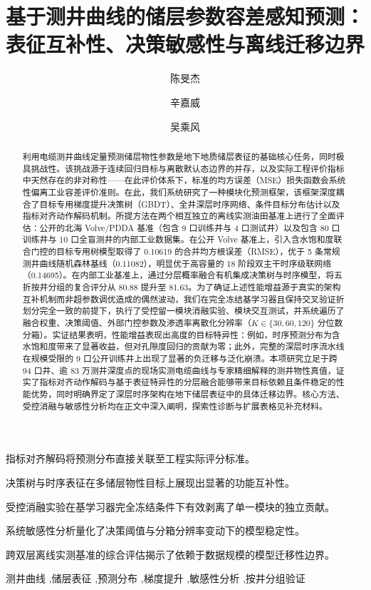\documentclass[preprint,12pt,nopreprintline]{elsarticle}
\begin{document}
\begin{frontmatter}
\title{基于测井曲线的储层参数容差感知预测：\\表征互补性、决策敏感性与离线迁移边界}
\author[aff1]{陈旻杰}
\author[aff2]{辛嘉威}
\author[aff1]{吴乘风}


\begin{abstract}
利用电缆测井曲线定量预测储层物性参数是地下地质储层表征的基础核心任务，同时极具挑战性。该挑战源于连续回归目标与离散默认态边界的并存，以及实际工程评价指标中天然存在的非对称性——在此评价体系下，标准的均方误差（MSE）损失函数会系统性偏离工业容差评价准则。在此，我们系统研究了一种模块化预测框架，该框架深度耦合了目标专用梯度提升决策树（GBDT）、全井深层时序网络、条件目标分布估计以及指标对齐动作解码机制。所提方法在两个相互独立的离线实测油田基准上进行了全面评估：公开的北海 Volve/PDDA 基准（包含 9 口训练井与 4 口测试井）以及包含 80 口训练井与 10 口全盲测井的内部工业数据集。在公开 Volve 基准上，引入含水饱和度联合门控的目标专用树模型取得了 0.10619 的合并均方根误差（RMSE），优于 5 条常规测井曲线随机森林基线（0.11082），明显优于高容量的 18 阶段双主干时序级联网络（0.14695）。在内部工业基准上，通过分层概率融合有机集成决策树与时序模型，将五折按井分组的复合评分从 80.88 提升至 81.63。为了确证上述性能增益源于真实的架构互补机制而非超参数调优造成的偶然波动，我们在完全冻结基学习器且保持交叉验证折划分完全一致的前提下，执行了受控留一模块消融实验、模块交互测试，并系统遍历了融合权重、决策阈值、外部门控参数及渗透率离散化分辨率（$K \in \{30, 60, 120\}$ 分位数分箱）。实证结果表明，性能增益表现出高度的目标特异性：例如，时序预测分布为含水饱和度带来了显著收益，但对孔隙度回归的贡献为零；此外，完整的深层时序流水线在规模受限的 9 口公开训练井上出现了显著的负迁移与泛化崩溃。本项研究立足于跨 94 口井、逾 83 万测井深度点的现场实测电缆曲线与专家精细解释的测井物性真值，证实了指标对齐动作解码与基于表征特异性的分层融合能够带来目标依赖且条件稳定的性能优势，同时明确界定了深层时序架构在地下储层表征中的具体迁移边界。核心方法、受控消融与敏感性分析均在正文中深入阐明，探索性诊断与扩展表格见补充材料。
\end{abstract}
\begin{highlights}
\item 指标对齐解码将预测分布直接关联至工程实际评分标准。
\item 决策树与时序表征在多储层物性目标上展现出显著的功能互补性。
\item 受控消融实验在基学习器完全冻结条件下有效剥离了单一模块的独立贡献。
\item 系统敏感性分析量化了决策阈值与分箱分辨率变动下的模型稳定性。
\item 跨双层离线实测基准的综合评估揭示了依赖于数据规模的模型迁移性边界。
\end{highlights}
\begin{keyword}
测井曲线 \sep 储层表征 \sep 预测分布 \sep 梯度提升 \sep 敏感性分析 \sep 按井分组验证
\end{keyword}
\end{frontmatter}
\end{document}
